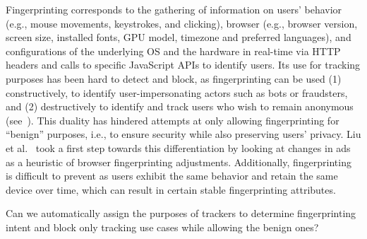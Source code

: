 %
Fingerprinting corresponds to the gathering of information on users’ behavior (e.g., mouse movements, keystrokes, and clicking), browser (e.g., browser version, screen size, installed fonts, GPU model, timezone and preferred languages), and configurations of the underlying OS and the hardware in real-time via HTTP headers and calls to specific JavaScript APIs to identify users. 
% 
Its use for tracking purposes has been hard to detect and block, as fingerprinting can be used (1) constructively, to identify user-impersonating actors such as bots or fraudsters, and (2) destructively to identify and track users who wish to remain anonymous (see~). 
%
This duality has hindered attempts at only allowing fingerprinting for ``benign'' purposes, i.e., to ensure security while also preserving users' privacy.
%
Liu et al.~\cite{liuFirstEarlyEvidence2025} took a first step towards this differentiation by looking at changes in ads as a heuristic of browser fingerprinting adjustments.
%
Additionally, fingerprinting is difficult to prevent as users exhibit the same behavior and retain the same device over time, which can result in certain stable fingerprinting attributes. 

\begin{opbox}
Can we automatically assign the purposes of trackers to determine fingerprinting intent and block only tracking use cases while allowing the benign ones?
\end{opbox}



